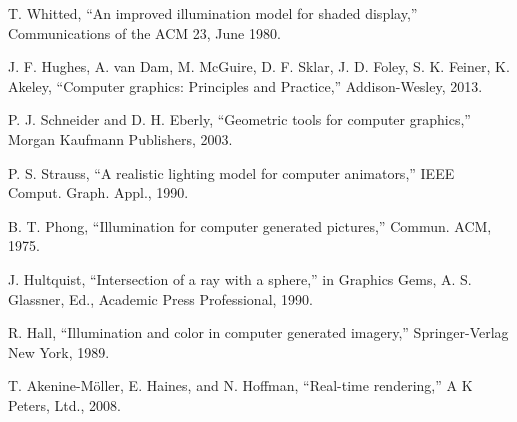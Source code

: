 \documentclass[conference]{IEEEtran}
\begin{document}
\begin{thebibliography}{00}
 T. Whitted, ``An improved illumination model for shaded display,'' Communications of the ACM 23, June 1980.

 J. F. Hughes, A. van Dam, M. McGuire, D. F. Sklar, J. D. Foley, S. K. Feiner, K. Akeley, ``Computer graphics: Principles and Practice,'' Addison-Wesley, 2013.

 P. J. Schneider and D. H. Eberly, ``Geometric tools for computer graphics,'' Morgan Kaufmann Publishers, 2003.

 P. S. Strauss, ``A realistic lighting model for computer animators,'' IEEE Comput. Graph. Appl., 1990.

 B. T. Phong, ``Illumination for computer generated pictures,'' Commun. ACM, 1975.

 J. Hultquist, ``Intersection of a ray with a sphere,'' in Graphics Gems, A. S. Glassner, Ed., Academic Press Professional, 1990.

 R. Hall, ``Illumination and color in computer generated imagery,'' Springer-Verlag New York, 1989.

 T. Akenine-Möller, E. Haines, and N. Hoffman, ``Real-time rendering,'' A K Peters, Ltd., 2008.

\end{thebibliography}
\end{document}
